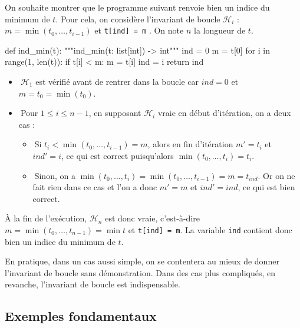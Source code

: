 \documentclass{magnolia}
\begin{document}
\vspace{2ex}
\begin{exempleUnique}
\exemple
  On souhaite montrer que le programme suivant renvoie bien un indice du
  minimum de $t$. Pour cela, on considère l'invariant de boucle $\mathcal{H}_i$ :
  \og $m = \min (t_0,\dots,t_{i - 1})$ et
  \verb:t[ind] = m: \fg. On note $n$ la longueur de $t$.
\begin{pythoncodeline}
def ind_min(t):
    """ind_min(t: list[int]) -> int"""
    ind = 0
    m = t[0]
    for i in range(1, len(t)):
        if t[i] < m:
            m = t[i]
            ind = i
    return ind
\end{pythoncodeline}
  \begin{itemize}
    \item $\ $$\mathcal{H}_1$ est vérifié avant de rentrer dans la boucle car
          $ind = 0$ et $m = t_0 = \min (t_0)$.
    \item $\ $Pour $1 \leq i \leq n-1$, en supposant $\mathcal{H}_i$ vraie en début
       d'itération, on a deux cas :
          \begin{itemize}
            \item
            $\ $Si $t_{i} < \min (t_0,\dots,t_{i-1}) = m$, alors
                  en fin d'itération $m'= t_{i}$ et $ind' = i$,
                  ce qui est correct puisqu'alors
                  $\min (t_{0}, \dots, t_{i}) = t_{i}$.
            \item $\ $Sinon, on a $\min (t_{0}, \dots, t_{i})
                  = \min (t_{0}, \dots, t_{i - 1}) = m = t_{ind}$.
                  Or on ne fait rien dans ce cas et l'on a donc
                  $m' = m$ et $ind' = ind$, ce qui est bien correct.
          \end{itemize}
  \end{itemize}
  À la fin de l'exécution, $\mathcal{H}_n$ est donc vraie, c'est-à-dire
  $m = \min (t_0,\dots,t_{n-1}) = \min t$ et \verb!t[ind] = m!. La variable
  \verb!ind! contient donc bien un indice du minimum de $t$.
\end{exempleUnique}

En pratique, dans un cas aussi simple, on se contentera au mieux de donner
l'invariant de boucle sans démonstration. Dans des cas plus compliqués, en
revanche, l'invariant de boucle est indispensable.

\subsection{Exemples fondamentaux}
\end{document}
